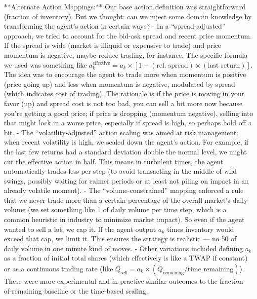 \documentclass[11pt]{article}
\begin{document}
		**Alternate Action Mappings:** 
		Our base action definition was straightforward (fraction of inventory). But we thought: can we inject some domain knowledge by transforming the agent’s action in certain ways?
		- In a “spread-adjusted” approach, we tried to account for the bid-ask spread and recent price momentum. If the spread is wide (market is illiquid or expensive to trade) and price momentum is negative, maybe reduce trading, for instance. The specific formula we used was something like $a_k^\text{effective} = a_k \times [1 + (\text{rel.~spread}) \times (\text{last return})]$. The idea was to encourage the agent to trade more when momentum is positive (price going up) and less when momentum is negative, modulated by spread (which indicates cost of trading). The rationale is if the price is moving in your favor (up) and spread cost is not too bad, you can sell a bit more now because you’re getting a good price; if price is dropping (momentum negative), selling into that might lock in a worse price, especially if spread is high, so perhaps hold off a bit.
		- The “volatility-adjusted” action scaling was aimed at risk management: when recent volatility is high, we scaled down the agent’s action. For example, if the last few returns had a standard deviation double the normal level, we might cut the effective action in half. This means in turbulent times, the agent automatically trades less per step (to avoid transacting in the middle of wild swings, possibly waiting for calmer periods or at least not piling on impact in an already volatile moment).
		- The “volume-constrained” mapping enforced a rule that we never trade more than a certain percentage of the overall market’s daily volume (we set something like 1 of daily volume per time step, which is a common heuristic in industry to minimize market impact). So even if the agent wanted to sell a lot, we cap it. If the agent output $a_k$ times inventory would exceed that cap, we limit it. This ensures the strategy is realistic — no 50 of daily volume in one minute kind of moves.
		- Other variations included defining $a_k$ as a fraction of initial total shares (which effectively is like a TWAP if constant) or as a continuous trading rate (like $Q_{\text{sell}} = a_k \times (Q_{\text{remaining}} / \text{time\_remaining})$). These were more experimental and in practice similar outcomes to the fraction-of-remaining baseline or the time-based scaling.
		
\end{document}
